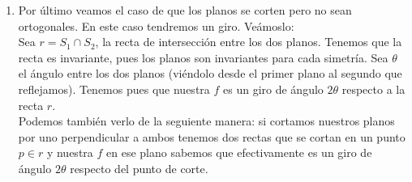 \documentclass[12pt]{article}
\begin{document}
\begin{ejercicio}[3 puntos]
\begin{enumerate}
\begin{enumerate}
            \item Por último veamos el caso de que los planos se corten pero no sean ortogonales. En este caso tendremos un giro. Veámoslo: \\
                Sea $r=S_1\cap S_2$, la recta de intersección entre los dos planos. Tenemos que la recta es invariante, pues los planos son invariantes para cada simetría. Sea $\theta$ el ángulo entre los dos planos (viéndolo desde el primer plano al segundo que reflejamos). Tenemos pues que nuestra $f$ es un giro de ángulo $2\theta$ respecto a la recta $r$. \\
                Podemos también verlo de la seguiente manera: si cortamos nuestros planos por uno perpendicular a ambos tenemos dos rectas que se cortan en un punto $p\in r$ y nuestra $f$ en ese plano sabemos que efectivamente es un giro de ángulo $2\theta$ respecto del punto de corte. 

        \end{enumerate}
        \end{enumerate}
        \end{ejercicio}
        
\end{document}
